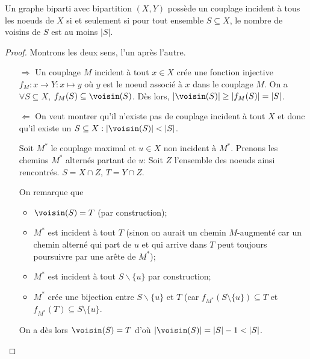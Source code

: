 \begin{mytheo} 
  \label{theo:hall}
  Un graphe biparti avec bipartition $(X , Y)$ possède un couplage incident à tous les noeuds de $X$
  si et seulement si pour tout ensemble $S \subseteq X$, le nombre de voisins de $S$ est au moins $|S|$.
  \begin{proof}
    Montrons les deux sens, l'un après l'autre.
    \begin{itemize}
      \item[$\Longrightarrow$]
        Un couplage $M$ incident à tout $x \in X$ crée une fonction injective
        $f_M : x \to Y: x \mapsto y$ où $y$ est le noeud associé à $x$ dans le couplage $M$.
        On a $\forall S \subseteq X$, $f_M(S) \subseteq \voisin(S)$.
        Dès lors, $|\voisin(S)| \geq |f_M(S)| = |S|$.
      \item[$\Longleftarrow$]
        On veut montrer qu'il n'existe pas de couplage incident à tout $X$
        et donc qu'il existe un $S \subseteq X : |\voisin(S)| < |S|$.

        Soit $M^*$ le couplage maximal et $u \in X$ non incident à $M^*$.
        Prenons les chemins $M^*$ alternés partant de $u$:
        Soit $Z$ l'ensemble des noeuds ainsi rencontrés.
        $S = X \cap Z$, $T = Y \cap Z$.

        On remarque que
        \begin{itemize}
          \item $\voisin(S) = T$ (par construction);
          \item	$M^*$ est incident à tout $T$ (sinon on aurait un chemin $M$-augmenté car un chemin alterné qui part de $u$ et qui arrive dans $T$ peut toujours poursuivre par une arête de $M^*$);
          \item $M^*$ est incident à tout $S\backslash\lbrace u\rbrace$ par construction;
          \item $M^*$ crée une bijection entre $S\backslash\lbrace u\rbrace$ et $T$
            (car $f_{M^*} (S\setminus \lbrace u\rbrace) \subseteq T$ et
            $f_{M^*}(T) \subseteq S\setminus\lbrace u\rbrace$.
        \end{itemize}
        On a dès lors $\voisin(S) = T$ d'où $|\voisin(S)| = |S| - 1 < |S|$.


\end{itemize}
\end{proof}
\end{mytheo}
